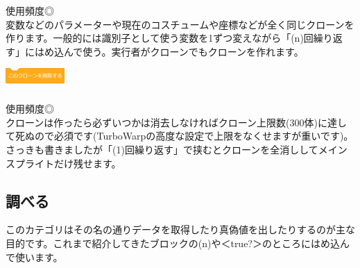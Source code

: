 \documentclass[b5paper,10pt]{jsarticle}
\begin{document}
\begin{multicols*}{3}
\begin{itembox}{10}
\end{itembox}
使用頻度◎\\
変数などのパラメーターや現在のコスチュームや座標などが全く同じクローンを作ります。一般的には識別子として使う変数を1ずつ変えながら「(n)回繰り返す」にはめ込んで使う。実行者がクローンでもクローンを作れます。
\begin{itembox}{11}
\includegraphics[height=8mm]{images/control_11.png}
\end{itembox}
使用頻度◎\\
クローンは作ったら必ずいつかは消去しなければクローン上限数(300体)に達して死ぬので必須です(TurboWarpの高度な設定で上限をなくせますが重いです)。さっきも書きましたが「(1)回繰り返す」で挟むとクローンを全消ししてメインスプライトだけ残せます。

\subsection{調べる}
このカテゴリはその名の通りデータを取得したり真偽値を出したりするのが主な目的です。これまで紹介してきたブロックの(n)や＜true?＞のところにはめ込んで使います。


\end{multicols*}
\end{document}

